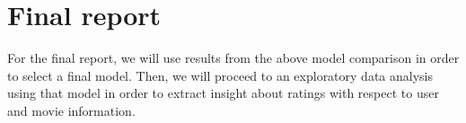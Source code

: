 \documentclass[bj, preprint]{imsart}
\begin{document}


\section{Final report}\label{sec:final}

For the final report, we will use results from the above model comparison in order to select a final model. Then, we will proceed to an exploratory data analysis using that model in order to extract insight about ratings with respect to user and movie information.

\newpage

{}
\end{document}
